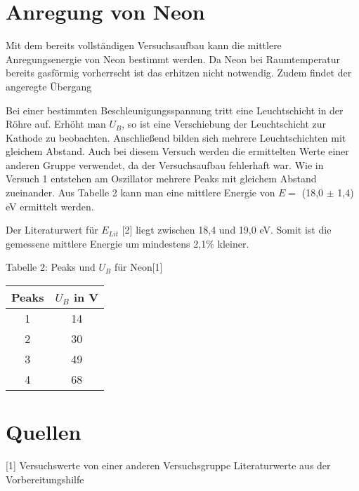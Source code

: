 \documentclass[a4paper,10pt]{scrartcl}
\begin{document}
\section{Anregung von Neon}
Mit dem bereits vollständigen Versuchsaufbau kann die mittlere Anregungsenergie von Neon bestimmt werden. Da Neon bei Raumtemperatur bereits gasförmig vorherrscht ist das erhitzen nicht notwendig. Zudem findet der angeregte Übergang \newline

Bei einer bestimmten Beschleunigungsspannung tritt eine Leuchtschicht in der Röhre auf. Erhöht man $U_B$, so ist eine Verschiebung der Leuchtschicht zur Kathode zu beobachten. Anschließend bilden sich mehrere Leuchtschichten mit gleichem Abstand.
\newline
Auch bei diesem Versuch werden die ermittelten Werte einer anderen Gruppe verwendet, da der Versuchsaufbau fehlerhaft war.\newline 
Wie in Versuch 1 entstehen am Oszillator mehrere Peaks mit gleichem Abstand zueinander. \newline  
Aus Tabelle 2 kann man eine mittlere Energie von $E =$ (18,0 $\pm$ 1,4) eV ermittelt werden.

Der Literaturwert für $E_{Lit}$ [2] liegt zwischen 18,4 und 19,0 eV. Somit ist die gemessene mittlere Energie um mindestens 2,1$\%$ kleiner.



\begin{center}
Tabelle 2: Peaks und $U_B$ für Neon[1]

\begin{tabular}{c c}
Peaks &$U_B$ in V   \\
\hline
  1 & 14   \\
2 & 30  \\
3 & 49   \\
4 & 68   \\


\end{tabular}
\end{center}

\section{Quellen}
[1] Versuchswerte von einer anderen Versuchsgruppe \newline 
[2] Literaturwerte aus der Vorbereitungshilfe
\end{document}
